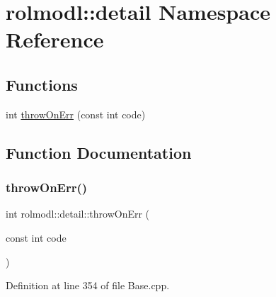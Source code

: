 \hypertarget{namespacerolmodl_1_1detail}{}\section{rolmodl\+::detail Namespace Reference}
\label{namespacerolmodl_1_1detail}
\subsection*{Functions}
\begin{DoxyCompactItemize}
\item 
int \mbox{\hyperlink{namespacerolmodl_1_1detail_a53099c89cc48f439defa581cc114fb97}{throw\+On\+Err}} (const int code)
\end{DoxyCompactItemize}


\subsection{Function Documentation}
\mbox{\label{namespacerolmodl_1_1detail_a53099c89cc48f439defa581cc114fb97}} 
\subsubsection{\texorpdfstring{throwOnErr()}{throwOnErr()}}
{\footnotesize\ttfamily int rolmodl\+::detail\+::throw\+On\+Err (\begin{DoxyParamCaption}\item[{const int}]{code }\end{DoxyParamCaption})}



Definition at line 354 of file Base.\+cpp.

